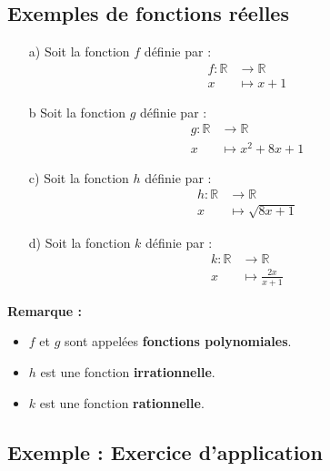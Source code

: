 \documentclass[a4paper,12pt]{article}
\begin{document}
\subsection*{Exemples de fonctions réelles}

\begin{enumerate}

     \item[a)] Soit la fonction \( f \) définie par :
    \[
    \begin{aligned}
        f : \mathbb{R} &\to \mathbb{R} \\
        x &\mapsto x + 1
    \end{aligned}
    \]
    \item[b] Soit la fonction \( g \) définie par :
    \[
    \begin{aligned}
        g : \mathbb{R} &\to \mathbb{R} \\
        x &\mapsto x^2 + 8x + 1
    \end{aligned}
    \]
    
    \item[c)] Soit la fonction \( h \) définie par :
    \[
    \begin{aligned}
        h : \mathbb{R} &\to \mathbb{R} \\
        x &\mapsto \sqrt{8x + 1}
    \end{aligned}
    \]
    
    \item[d)] Soit la fonction \( k \) définie par :
    \[
    \begin{aligned}
        k : \mathbb{R} &\to \mathbb{R} \\
        x &\mapsto \frac{2x}{x+1}
    \end{aligned}
    \]
\end{enumerate}

\textbf{Remarque :}
\begin{itemize}
    \item \( f \) et \( g \) sont appelées \textbf{fonctions polynomiales}.
    \item \( h \) est une fonction \textbf{irrationnelle}.
    \item \( k \) est une fonction \textbf{rationnelle}.
\end{itemize}

\subsection*{Exemple : Exercice d'application}
\end{document}
